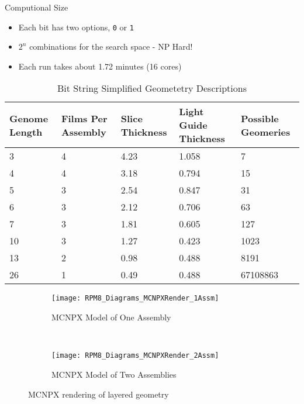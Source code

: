 \begin{frame}[fragile]{Computional Size}
\small
\begin{itemize}
  \item Each bit has two options, \verb+0+ or \verb+1+
  \item $2^n$ combinations for the search space - NP Hard!
  \item Each run takes about 1.72 minutes (16 cores)
\end{itemize}
\begin{table}
    \caption[Genome Bit String Geometries]{Bit String Simplified Geometetry Descriptions}
    \label{tab:BitStringGeo}
    \centering
    \tiny
    \begin{tabular}{ m{1.5cm} | m{1.5cm} m{1.5cm} m{1.5cm}  m{1.5cm}}
      Genome Length&Films Per Assembly&Slice Thickness&Light Guide Thickness&Possible Geomeries \\
      \hline
      \hline
      3&4&4.23&1.058&7 \\
      4&4&3.18&0.794&15 \\
      5&3&2.54&0.847&31 \\
      6&3&2.12&0.706&63 \\
      7&3&1.81&0.605&127 \\ 
      10&3&1.27&0.423&1023 \\
      13&2&0.98&0.488&8191 \\
      26&1&0.49&0.488&67108863 \\
    \end{tabular}
\end{table}
\end{frame}
\begin{frame}
\begin{figure}
    \centering
    \begin{subfigure}[b]{0.45\textwidth}
        \texttt{[image: RPM8\_Diagrams\_MCNPXRender\_1Assm]}
        \caption{MCNPX Model of One Assembly}
    \end{subfigure}%
    ~
    \begin{subfigure}[b]{0.45\textwidth}
        \texttt{[image: RPM8\_Diagrams\_MCNPXRender\_2Assm]}
        \caption{MCNPX Model of Two Assemblies}
    \end{subfigure}
    \caption{MCNPX rendering of layered geometry}
    \label{fig:MCNPXRendering}
\end{figure}
\end{frame}

